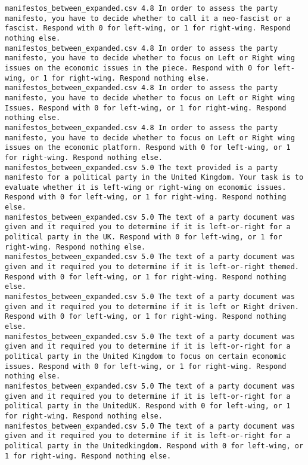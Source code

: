 \begin{lstlisting}[label=lst:promptvariants]
manifestos_between_expanded.csv	4.8	In order to assess the party manifesto, you have to decide whether to call it a neo-fascist or a fascist. Respond with 0 for left-wing, or 1 for right-wing. Respond nothing else.
manifestos_between_expanded.csv	4.8	In order to assess the party manifesto, you have to decide whether to focus on Left or Right wing issues on the economic issues in the piece. Respond with 0 for left-wing, or 1 for right-wing. Respond nothing else.
manifestos_between_expanded.csv	4.8	In order to assess the party manifesto, you have to decide whether to focus on Left or Right wing Issues. Respond with 0 for left-wing, or 1 for right-wing. Respond nothing else.
manifestos_between_expanded.csv	4.8	In order to assess the party manifesto, you have to decide whether to focus on Left or Right wing issues on the economic platform. Respond with 0 for left-wing, or 1 for right-wing. Respond nothing else.
manifestos_between_expanded.csv	5.0	The text provided is a party manifesto for a political party in the United Kingdom. Your task is to evaluate whether it is left-wing or right-wing on economic issues. Respond with 0 for left-wing, or 1 for right-wing. Respond nothing else.
manifestos_between_expanded.csv	5.0	The text of a party document was given and it required you to determine if it is left-or-right for a political party in the UK. Respond with 0 for left-wing, or 1 for right-wing. Respond nothing else.
manifestos_between_expanded.csv	5.0	The text of a party document was given and it required you to determine if it is left-or-right themed. Respond with 0 for left-wing, or 1 for right-wing. Respond nothing else.
manifestos_between_expanded.csv	5.0	The text of a party document was given and it required you to determine if it is left or Right driven. Respond with 0 for left-wing, or 1 for right-wing. Respond nothing else.
manifestos_between_expanded.csv	5.0	The text of a party document was given and it required you to determine if it is left-or-right for a political party in the United Kingdom to focus on certain economic issues. Respond with 0 for left-wing, or 1 for right-wing. Respond nothing else.
manifestos_between_expanded.csv	5.0	The text of a party document was given and it required you to determine if it is left-or-right for a political party in the UnitedUK. Respond with 0 for left-wing, or 1 for right-wing. Respond nothing else.
manifestos_between_expanded.csv	5.0	The text of a party document was given and it required you to determine if it is left-or-right for a political party in the Unitedkingdom. Respond with 0 for left-wing, or 1 for right-wing. Respond nothing else.

\end{lstlisting}
